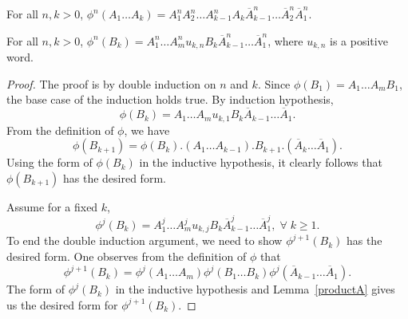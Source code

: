 \documentclass[10pt,a4paper]{amsart}
\begin{document}
\begin{lem}\label{productA} For all $n , k > 0$,
${\phi^{n}(A_1 \ldots A_{k})} = A_1^{n}A_2^n \ldots A_{k-1}^nA_{k} \overline{A}^n_{k-1} \ldots \overline{A}^n_2 \overline{A}^n_1.$
\end{lem}

\begin{lem}\label{linear}
For all $n , k > 0$, $\phi^n(B_k) = A_1^n \ldots A_m^n u_{k,n}B_k\overline{A}^{n}_{k-1} \ldots \overline{A}^{n}_1$, where $u_{k,n}$ is a positive word.
\end{lem}

\begin{proof}
The proof is by double induction on $n$ and $k$. Since $\phi (B_1) = A_1 \ldots A_m B_1$, the base case of the induction holds true. By induction hypothesis, $$\phi(B_k) = A_1 \ldots A_m u_{k,1}B_k \overline{A}_{k-1} \ldots \overline{A}_1.$$  
From the definition of $\phi$,  we have $$\phi(B_{k+1}) = \phi (B_k) . (A_1 \ldots A_{k-1}). B_{k+1} . (\overline{A}_k \ldots \overline{A}_1).$$ 
Using the form of $\phi(B_k)$ in the inductive hypothesis, it clearly follows that $\phi(B_{k+1})$ has the desired form.

Assume for a fixed $k$,
$$\phi^j(B_k) = A_1^j \ldots A_m^j u_{k,j}B_k\overline{A}^{j}_{k-1} \ldots \overline{A}^{j}_1, \;  \forall \; k \geq 1.$$
To end the double induction argument, we need to show $\phi^{j+1} (B_k)$ has the desired form. One observes from the definition of $\phi$ that $$\phi^{j+1} (B_k) = \phi^j (A_1 \ldots A_m) \phi^j (B_1 \ldots B_k) \phi^j (\overline{A}_{k-1} \ldots \overline{A}_1).$$
The form of $\phi^j(B_k)$ in the inductive hypothesis and Lemma~\ref{productA} gives us the desired form for $\phi^{j+1} (B_{k}).$







\end{proof}
\end{document}
